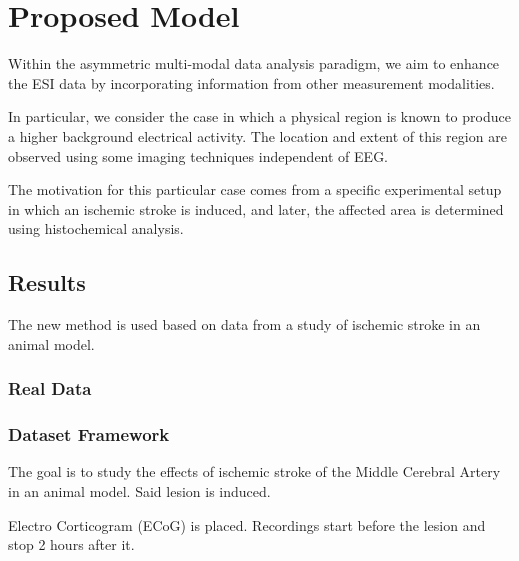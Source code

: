 \chapter{Proposed Model}
%
%
%

Within the asymmetric multi-modal data analysis paradigm, we aim to enhance the ESI data by incorporating information from other measurement modalities.

In particular, we consider the case in which a physical region is known to produce a higher background electrical activity.
%
The location and extent of this region are observed using some imaging techniques independent of EEG.

The motivation for this particular case comes from a specific experimental setup in which an ischemic stroke is induced, and later, the affected area is determined using histochemical analysis.

\section{Results}

The new method is used based on data from a study of ischemic stroke in an animal model.

\subsection{Real Data}



\subsection{Dataset Framework}
The goal is to study the effects of
ischemic stroke of the Middle Cerebral Artery in an animal
model. 
Said lesion is induced.

Electro Corticogram (ECoG) is placed. Recordings start before the lesion and stop 2 hours after it.

